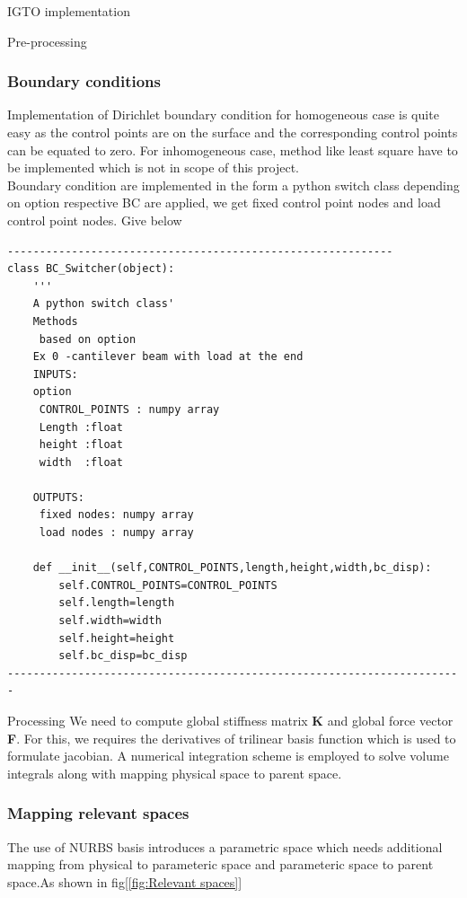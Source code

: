\documentclass[a4paper,12pt,times]{article}
\begin{document}
\begin{section}{IGTO implementation}
\begin{subsection}{Pre-processing}
\subsubsection{Boundary conditions}
Implementation of Dirichlet boundary condition for homogeneous case is quite easy as the control points are on the surface and the corresponding control points can be equated to zero. For inhomogeneous case, method like least square have to be implemented which is not in scope of this project.\\
Boundary condition are implemented in the form a python switch class depending on option respective BC are applied, we get fixed control point nodes and load control point nodes. Give below 
\begin{verbatim}
------------------------------------------------------------
class BC_Switcher(object):
	'''
	A python switch class'
	Methods
	 based on option 
	Ex 0 -cantilever beam with load at the end
	INPUTS:
	option
	 CONTROL_POINTS : numpy array
	 Length :float
	 height :float
	 width  :float
	 
	OUTPUTS:
	 fixed nodes: numpy array
	 load nodes : numpy array
	 
    def __init__(self,CONTROL_POINTS,length,height,width,bc_disp):
        self.CONTROL_POINTS=CONTROL_POINTS
        self.length=length
        self.width=width
        self.height=height
        self.bc_disp=bc_disp
-----------------------------------------------------------------------
\end{verbatim}  
\end{subsection}

\begin{subsection}{Processing}
We need to compute global stiffness matrix \textbf{K} and global force vector \textbf{F}. For this, we requires the derivatives of trilinear basis function which is used to formulate jacobian. A numerical integration scheme is employed to solve volume integrals along with mapping physical space to parent space.  

\subsubsection{Mapping relevant spaces}

The use of NURBS basis introduces a parametric space which needs additional mapping from physical to parameteric space and parameteric space to parent space.As shown in fig[\ref{fig:Relevant spaces}]

\end{subsection}
\end{section}
\end{document}

